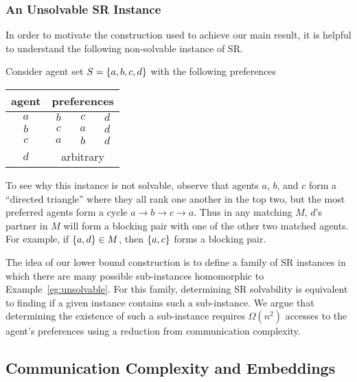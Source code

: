 \subsubsection{An Unsolvable SR Instance}\label{sec:unsolvable}

In order to motivate the construction used to achieve our main result, it is helpful to understand the following non-solvable instance of SR.

\begin{eg}\label{eg:unsolvable}
    Consider agent set $S = \left\{a, b, c, d\right\}$ with the following preferences
    \begin{center}
        \begin{tabular}{c|ccc}
            agent & \multicolumn{3}{c}{preferences}\\
            \hline
            $a$ & $b$ & $c$ & $d$\\
            $b$ & $c$ & $a$ & $d$\\
            $c$ & $a$ & $b$ & $d$\\
            $d$ & \multicolumn{3}{c}{arbitrary}
        \end{tabular}
    \end{center}
    To see why this instance is not solvable, observe that agents $a$, $b$, and $c$ form a ``directed triangle'' where they all rank one another in the top two, but the most preferred agents form a cycle $a \to b \to c \to a$. Thus in any matching $M$, $d$'s partner in $M$ will form a blocking pair with one of the other two matched agents. For example, if $\left\{a, d\right\} \in M$, then $\left\{a, c\right\}$ forms a blocking pair.
\end{eg}

The idea of our lower bound construction is to define a family of SR instances in which there are many possible sub-instances homomorphic to Example~\ref{eg:unsolvable}. For this family, determining SR solvability is equivalent to finding if a given instance contains such a sub-instance. We argue that determining the existence of such a sub-instance requires $\Omega(n^2)$ accesses to the agent's preferences using a reduction from communication complexity.

\subsection{Communication Complexity and Embeddings}
\label{sec:communication}

